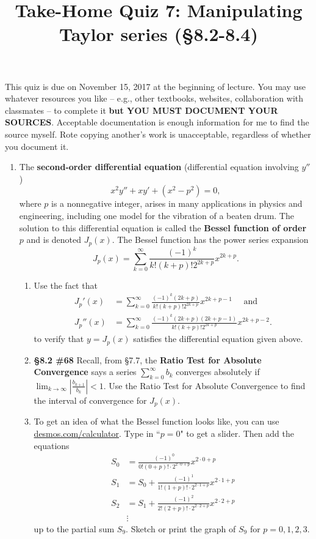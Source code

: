 \documentclass[%
]{article}
\title{\vspace{-3.5pc} 
	\flushleft \bf \Large Take-Home Quiz 7: Manipulating Taylor series %
	 (\S8.2-8.4)}
\date{}
\begin{document}
\maketitle

\vspace{-3pc}
 This quiz is due on November 15, 2017 at the beginning of lecture.  You may use whatever resources you like -- e.g., other textbooks, websites, collaboration with classmates -- to complete it \textbf{but YOU MUST DOCUMENT YOUR SOURCES}.  Acceptable documentation is enough information for me to find the source myself.  Rote copying another's work is unacceptable, regardless of whether you document it.  

\noindent\hrulefill

\begin{enumerate}

\item The \textbf{second-order differential equation} (differential equation involving $y''$)
\[
x^2y''+xy'+(x^2-p^2)=0,
\]
where $p$ is a nonnegative integer, arises in many applications in physics and engineering, including one model for the vibration of a beaten drum.
%
The solution to this differential equation is called the \textbf{Bessel function of order $p$} and is denoted $J_p(x)$.  The Bessel function has the power series expansion
\[
J_p(x)=\sum_{k=0}^{\infty}\frac{(-1)^k}{k!(k+p)!2^{2k+p}}x^{2k+p}.
\]
	\begin{enumerate}
	\item Use the fact that  
	\begin{align*}
	J_p'(x) &= \sum_{k=0}^{\infty}\frac{(-1)^k(2k+p)}{k!(k+p)!2^{2k+p}}x^{2k+p-1} \quad \text{ and }\\
	J_p''(x) &= \sum_{k=0}^{\infty}\frac{(-1)^k(2k+p)(2k+p-1)}{k!(k+p)!2^{2k+p}}x^{2k+p-2}.
	\end{align*}
	to verify that $y=J_p(x)$ satisfies the differential equation given above.
	\item {\bf \S8.2 \#68} Recall, from \S7.7, the \textbf{Ratio Test for Absolute Convergence} says a series $\sum_{k=0}^{\infty}b_k$ converges absolutely if $\lim_{k\to\infty}\left|\frac{b_{k+1}}{b_k}\right|<1$.  Use the Ratio Test for Absolute Convergence to find the interval of convergence for $J_p(x)$.
	\item To get an idea of what the Bessel function looks like, you can use \url{desmos.com/calculator}.  Type in ``$p=0$" to get a slider.  Then add the equations
	\begin{align*}
	S_0 &= \frac{(-1)^0}{0!(0+p)!\cdot 2^{2\cdot 0+p}}x^{2\cdot 0+p} \\
	S_1 &= S_0+\frac{(-1)^1}{1!(1+p)!\cdot 2^{2\cdot 1+p}}x^{2\cdot 1+p} \\
	S_2 &= S_1+\frac{(-1)^2}{2!(2+p)!\cdot 2^{2\cdot 2+p}}x^{2\cdot 2+p} \\
	 &\vdots
	\end{align*}
	up to the partial sum $S_9$.  Sketch or print the graph of $S_9$ for $p=0,1,2,3$.
	\end{enumerate}
	

\end{enumerate}
\end{document}
